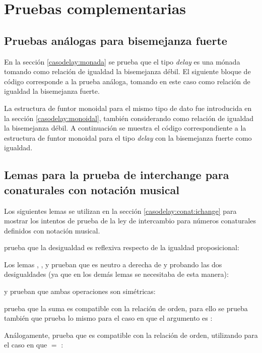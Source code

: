 \chapter{Pruebas complementarias}\label{apendice:pruebas}

\section{Pruebas análogas para bisemejanza fuerte}\label{apendice:fuerte}
 
En la sección \ref{casodelay:monada} se prueba que el tipo \textit{delay} es una mónada tomando como relación de igualdad la bisemejanza débil. El siguiente bloque de código corresponde a la prueba análoga, tomando en este caso como relación de igualdad la bisemejanza fuerte. 


La estructura de funtor monoidal para el mismo tipo de dato fue introducida en la sección \ref{casodelay:monoidal}, también considerando como relación de igualdad la bisemejanza débil. A continuación se muestra el código correspondiente a la estructura de funtor monoidal para el tipo \textit{delay} con la bisemejanza fuerte como igualdad.


\section{Lemas para la prueba de interchange para conaturales con notación musical}\label{apendice:lemasmus}

Los siguientes lemas se utilizan en la sección \ref{casodelay:conat:ichange} para mostrar los intentos de prueba de la ley de intercambio para números conaturales definidos con notación musical. 

\AgdaFunction{$\equiv\Rightarrow\gtrsim$} prueba que la desigualdad es reflexiva respecto de la igualdad proposicional:

Los lemas , ,  y  prueban que  es neutro a derecha de  y  probando las dos desigualdades (ya que en los demás lemas se necesitaba de esta manera):

 y  prueban que ambas operaciones son simétricas:

 prueba que la suma es compatible con la relación de orden, para ello se prueba también  que prueba lo mismo para el caso en que el argumento  es :

Análogamente,  prueba que  es compatible con la relación de orden, utilizando  para el caso en que  $=$ :
